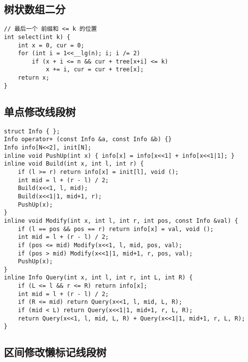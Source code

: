 \documentclass[a4paper,landscape,twocolumn]{ctexart}
\begin{document}
\subsection{树状数组二分}

\begin{lstlisting}
// 最后一个 前缀和 <= k 的位置
int select(int k) {
	int x = 0, cur = 0;
	for (int i = 1<<__lg(n); i; i /= 2)
		if (x + i <= n && cur + tree[x+i] <= k)
			x += i, cur = cur + tree[x];
	return x;
}
\end{lstlisting}

\subsection{单点修改线段树}

\begin{lstlisting}
struct Info { };
Info operator+ (const Info &a, const Info &b) {}
Info info[N<<2], init[N];
inline void PushUp(int x) { info[x] = info[x<<1] + info[x<<1|1]; }
inline void Build(int x, int l, int r) {
	if (l >= r) return info[x] = init[l], void ();
	int mid = l + (r - l) / 2;
	Build(x<<1, l, mid);
	Build(x<<1|1, mid+1, r);
	PushUp(x);
}
inline void Modify(int x, int l, int r, int pos, const Info &val) {
	if (l == pos && pos == r) return info[x] = val, void ();
	int mid = l + (r - l) / 2;
	if (pos <= mid) Modify(x<<1, l, mid, pos, val);
	if (pos > mid) Modify(x<<1|1, mid+1, r, pos, val);
	PushUp(x);
}
inline Info Query(int x, int l, int r, int L, int R) {
	if (L <= l && r <= R) return info[x];
	int mid = l + (r - l) / 2;
	if (R <= mid) return Query(x<<1, l, mid, L, R);
	if (mid < L) return Query(x<<1|1, mid+1, r, L, R);
	return Query(x<<1, l, mid, L, R) + Query(x<<1|1, mid+1, r, L, R);
}
\end{lstlisting}

\subsection{区间修改懒标记线段树}
\end{document}
